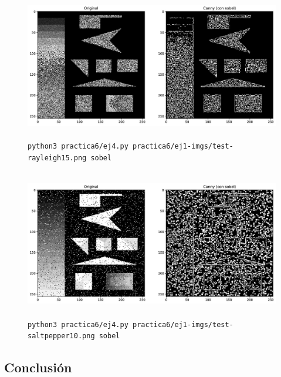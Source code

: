 \documentclass[11pt, spanish]{article}
\begin{document}
\begin{figure}[H]
\centering
    \includegraphics[height=6.5cm]{informe-imgs/ej4-sobel-test-rayleigh15.jpg}
    \caption{\texttt{python3 practica6/ej4.py practica6/ej1-imgs/test-rayleigh15.png sobel}}
\end{figure}

\begin{figure}[H]
\centering
    \includegraphics[height=6.5cm]{informe-imgs/ej4-sobel-test-saltpepper10.jpg}
    \caption{\texttt{python3 practica6/ej4.py practica6/ej1-imgs/test-saltpepper10.png sobel}}
\end{figure}

\newpage
\subsection{Conclusión}
\end{document}
